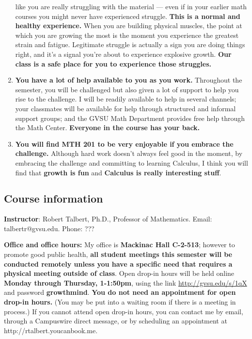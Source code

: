 \documentclass[]{article}
\begin{document}
\begin{enumerate}
  like you are really struggling with the material --- even if in your
  earlier math courses you might never have experienced struggle.
  \textbf{This is a normal and healthy experience.} When you are
  building physical muscles, the point at which you are growing the most
  is the moment you experience the greatest strain and fatigue.
  Legitimate struggle is actually a sign you are doing things right, and
  it's a signal you're about to experience explosive growth. \textbf{Our
  class is a safe place for you to experience those struggles.}
\item
  \textbf{You have a lot of help available to you as you work.}
  Throughout the semester, you will be challenged but also given a lot
  of support to help you rise to the challenge. I will be readily
  available to help in several channels; your classmates will be
  available for help through structured and informal support groups; and
  the GVSU Math Department provides free help through the Math Center.
  \textbf{Everyone in the course has your back.}
\item
  \textbf{You will find MTH 201 to be very enjoyable if you embrace the
  challenge.} Although hard work doesn't always feel good in the moment,
  by embracing the challenge and committing to learning Calculus, I
  think you will find that \textbf{growth is fun} and \textbf{Calculus
  is really interesting stuff}.
\end{enumerate}

\hypertarget{course-information}{%
\subsection{Course information}\label{course-information}}

\textbf{Instructor}: Robert Talbert, Ph.D., Professor of Mathematics.
Email: talbertr@gvsu.edu. Phone: ???

\textbf{Office and office hours:} My office is \textbf{Mackinac Hall
C-2-513}; however to promote good public health, \textbf{all student
meetings this semester will be conducted remotely unless you have a
specific need that requires a physical meeting outside of class}. Open
drop-in hours will be held online \textbf{Monday through Thursday,
1-1:50pm}, using the link \url{http://gvsu.edu/s/1qX} and password
\textbf{growthmind}. \textbf{You do not need an appointment for open
drop-in hours.} (You may be put into a waiting room if there is a
meeting in process.) If you cannot attend open drop-in hours, you can
contact me by email, through a Campuswire direct message, or by
scheduling an appointment at http://rtalbert.youcanbook.me.
\end{document}
